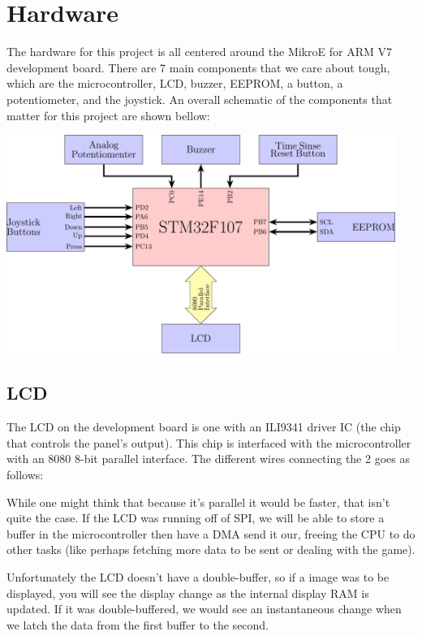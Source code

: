 \documentclass[12pt, a4paper]{article}
\newenvironment{Figure}
  {\par\medskip\noindent\minipage{\linewidth}\centering}
  {\endminipage\par\medskip}
\begin{document}
    \section{Hardware} \label{sec:hardware}
    The hardware for this project is all centered around the MikroE for ARM V7 development board. There are 7 main components that we care about tough, which are the microcontroller, LCD, buzzer, EEPROM, a button, a potentiometer, and the joystick. An overall schematic of the components that matter for this project are shown bellow:
    \begin{Figure}\centering\includegraphics[width=0.95\textwidth]{TikzDrawings/schematic.pdf}\end{Figure}
    
    \subsection{LCD}
    The LCD on the development board is one with an ILI9341 driver IC (the chip that controls the panel's output). This chip is interfaced with the microcontroller with an 8080 8-bit parallel interface. The different wires connecting the 2 goes as follows:
    
    While one might think that because it's parallel it would be faster, that isn't quite the case. If the LCD was running off of SPI, we will be able to store a buffer in the microcontroller then have a DMA send it our, freeing the CPU to do other tasks (like perhaps fetching more data to be sent or dealing with the game). 
    
    Unfortunately the LCD doesn't have a double-buffer, so if a image was to be displayed, you will see the display change as the internal display RAM is updated. If it was double-buffered, we would see an instantaneous change when we latch the data from the first buffer to the second.
    
\end{document}
